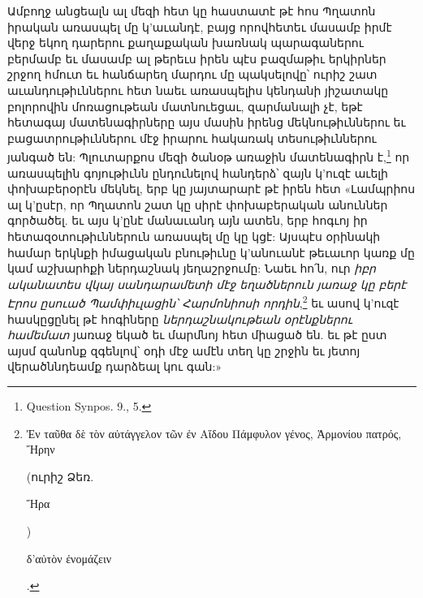\documentclass{article}
\begin{document}
{Ամբողջ անցեալն ալ մեզի հետ կը հաստատէ թէ հոս Պղատոն իրական առասպել մը կ'աւանդէ, բայց որովհետեւ մասամբ իրմէ վերջ եկող դարերու քաղաքական խառնակ պարագաներու բերմամբ եւ մասամբ ալ թերեւս իրեն պէս բազմաթիւ երկիրներ շրջող հմուտ եւ հանճարեղ մարդու մը պակսելովը՝ ուրիշ շատ աւանդութիւններու հետ նաեւ առասպելիս կենդանի յիշատակը բոլորովին մոռացութեան մատնուեցաւ, զարմանալի չէ, եթէ հետագայ մատենագիրները այս մասին իրենց մեկնութիւններու եւ բացատրութիւններու մէջ իրարու հակառակ տեսութիւններու յանգած են: Պլուտարքոս մեզի ծանօթ առաջին մատենագիրն է,\footnote{Question Synpos. 9., 5.} որ առասպելին գոյութիւնն ընդունելով հանդերձ՝ զայն կ'ուզէ աւելի փոխաբերօրէն մեկնել, երբ կը յայտարարէ թէ իրեն հետ «Լամպրիոս ալ կ'ըսէր, որ Պղատոն շատ կը սիրէ փոխաբերական անուններ գործածել. եւ այս կ'ընէ մանաւանդ այն ատեն, երբ հոգւոյ իր հետազօտութիւններուն առասպել մը կը կցէ: Այսպէս օրինակի համար երկնքի իմացական բնութիւնը կ'անուանէ թեւաւոր կառք մը կամ աշխարհքի ներդաշնակ յեղաշրջումը: Նաեւ հո՛ն, ուր \emph{իբր ականատես վկայ սանդարամետի մէջ եղածներուն յառաջ կը բերէ Էրոս ըսուած Պամփիւլացին՝ Հարմոնիոսի որդին},\footnote{\begin{greek}Ἐν ταῦθα δὲ τὸν αὐτάγγελον τῶν ἐν Αἵδου Πάμφυλον γένος, Ἁρμονίου πατρός, Ἤρην\end{greek} (ուրիշ Ձեռ. \begin{greek}Ἤρα\end{greek}) \begin{greek}δ'αὐτὸν ἐνομάζειν\end{greek}.} եւ ասով կ'ուզէ հասկըցընել թէ հոգիները \emph{ներդաշնակութեան օրէնքներու համեմատ} յառաջ եկած եւ մարմնոյ հետ միացած են. եւ թէ ըստ այսմ զանոնք զգենլով՝ օդի մէջ ամէն տեղ կը շրջին եւ յետոյ վերածննդեամք դարձեալ կու գան:»

}
\end{document}
